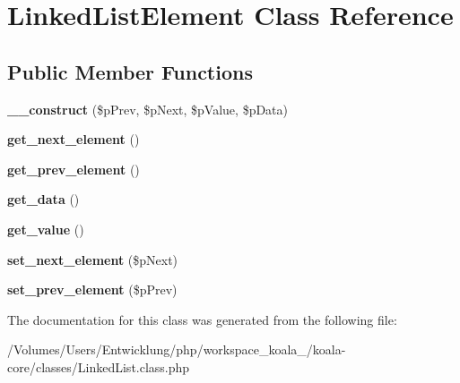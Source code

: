 \hypertarget{class_linked_list_element}{
\section{LinkedListElement Class Reference}
\label{class_linked_list_element}
}
\subsection*{Public Member Functions}
\begin{DoxyCompactItemize}
\item 
\hypertarget{class_linked_list_element_ad12f8a609d5cef47935f6a3911735e4d}{
{\bfseries \_\-\_\-construct} (\$pPrev, \$pNext, \$pValue, \$pData)}
\label{class_linked_list_element_ad12f8a609d5cef47935f6a3911735e4d}

\item 
\hypertarget{class_linked_list_element_ade5e15f5272e728f821397ee67d557b4}{
{\bfseries get\_\-next\_\-element} ()}
\label{class_linked_list_element_ade5e15f5272e728f821397ee67d557b4}

\item 
\hypertarget{class_linked_list_element_a77cab4ebcb96b17d5a3a3ecfae54b4f0}{
{\bfseries get\_\-prev\_\-element} ()}
\label{class_linked_list_element_a77cab4ebcb96b17d5a3a3ecfae54b4f0}

\item 
\hypertarget{class_linked_list_element_a03f1337ffd9f1ee32dd8fb996c58ae3d}{
{\bfseries get\_\-data} ()}
\label{class_linked_list_element_a03f1337ffd9f1ee32dd8fb996c58ae3d}

\item 
\hypertarget{class_linked_list_element_a23086d04d4c5d3682c0975059137b6ac}{
{\bfseries get\_\-value} ()}
\label{class_linked_list_element_a23086d04d4c5d3682c0975059137b6ac}

\item 
\hypertarget{class_linked_list_element_a4e120f1c4f0f670b160f595075ca0254}{
{\bfseries set\_\-next\_\-element} (\$pNext)}
\label{class_linked_list_element_a4e120f1c4f0f670b160f595075ca0254}

\item 
\hypertarget{class_linked_list_element_a44b7e6c2648036fd20045cee93493e4a}{
{\bfseries set\_\-prev\_\-element} (\$pPrev)}
\label{class_linked_list_element_a44b7e6c2648036fd20045cee93493e4a}

\end{DoxyCompactItemize}


The documentation for this class was generated from the following file:\begin{DoxyCompactItemize}
\item 
/Volumes/Users/Entwicklung/php/workspace\_\-koala\_/koala-\/core/classes/LinkedList.class.php\end{DoxyCompactItemize}
